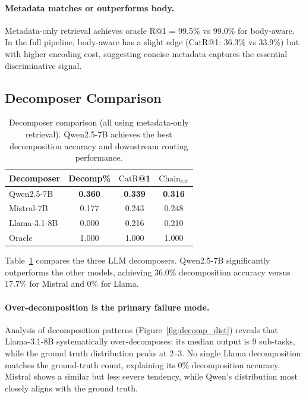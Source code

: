 \documentclass[11pt]{article}
\newcommand{\catrecall}{\text{CatR}}
\newcommand{\chaincat}{\text{Chain}_\text{cat}}
\begin{document}
\paragraph{Metadata matches or outperforms body.}
Metadata-only retrieval achieves oracle R@1 = 99.5\% vs 99.0\% for body-aware.
In the full pipeline, body-aware has a slight edge ($\catrecall$@1: 36.3\% vs 33.9\%) but with higher encoding cost, suggesting concise metadata captures the essential discriminative signal.

\subsection{Decomposer Comparison}

\begin{table}[t]
\centering
\small
\begin{tabular}{lccc}
\toprule
\textbf{Decomposer} & \textbf{Decomp\%} & $\catrecall$\textbf{@1} & $\chaincat$ \\
\midrule
Qwen2.5-7B & \textbf{0.360} & \textbf{0.339} & \textbf{0.316} \\
Mistral-7B & 0.177 & 0.243 & 0.248 \\
Llama-3.1-8B & 0.000 & 0.216 & 0.210 \\
\midrule
Oracle & 1.000 & 1.000 & 1.000 \\
\bottomrule
\end{tabular}
\caption{Decomposer comparison (all using metadata-only retrieval). Qwen2.5-7B achieves the best decomposition accuracy and downstream routing performance.}
\label{tab:decomposer}
\end{table}

Table~\ref{tab:decomposer} compares the three LLM decomposers.
Qwen2.5-7B significantly outperforms the other models, achieving 36.0\% decomposition accuracy versus 17.7\% for Mistral and 0\% for Llama.

\paragraph{Over-decomposition is the primary failure mode.}
Analysis of decomposition patterns (Figure~\ref{fig:decomp_dist}) reveals that Llama-3.1-8B systematically over-decomposes: its median output is 9 sub-tasks, while the ground truth distribution peaks at 2--3.
No single Llama decomposition matches the ground-truth count, explaining its 0\% decomposition accuracy.
Mistral shows a similar but less severe tendency, while Qwen's distribution most closely aligns with the ground truth.
\end{document}
